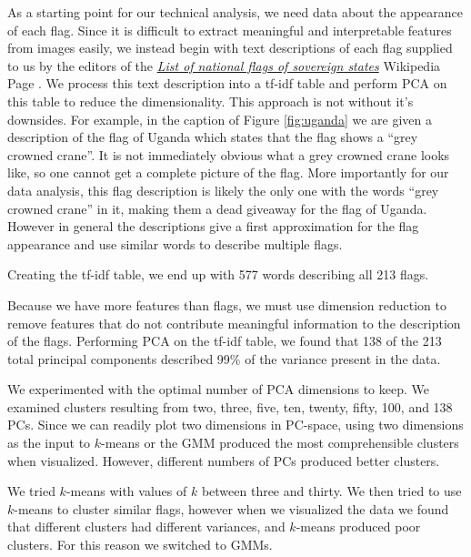 \documentclass[11pt]{amsart}
\newcommand{\todo}[1]{\textcolor{red}{TODO: #1}}
\begin{document}

As a starting point for our technical analysis, we need data about the
appearance of each flag. Since it is difficult to extract meaningful and
interpretable features from images easily, we instead begin with text
descriptions of each flag supplied to us by the editors of the
\href{https://en.wikipedia.org/wiki/List_of_national_flags_of_sovereign_states}{\emph{List
of national flags of sovereign states}} Wikipedia Page \cite{list-of-flags}. We
process this text description into a tf-idf table and perform PCA on this table
to reduce the dimensionality. This approach is not without it's downsides. For
example, in the caption of Figure \ref{fig:uganda} we are given a description of
the flag of Uganda which states that the flag shows a ``grey crowned crane''. It
is not immediately obvious what a grey crowned crane looks like, so one cannot
get a complete picture of the flag. More importantly for our data analysis, this
flag description is likely the only one with the words ``grey crowned crane'' in
it, making them a dead giveaway for the flag of Uganda. However in general the
descriptions give a first approximation for the flag appearance and use similar
words to describe multiple flags.

Creating the tf-idf table, we end up with 577 words describing all 213 flags.


Because we have more features than flags, we must use dimension reduction to
remove features that do not contribute meaningful information to the description
of the flags. Performing PCA on the tf-idf table, we found that 138 of the 213
total principal components described 99\% of the variance present in the data. 

We experimented with the optimal number of PCA dimensions to keep. We examined
clusters resulting from two, three, five, ten, twenty, fifty, 100, and 138 PCs.
Since we can readily plot two dimensions in PC-space, using two dimensions as
the input to \(k\)-means or the GMM produced the most comprehensible clusters
when visualized. However, different numbers of PCs produced better clusters.

We tried \(k\)-means with values of \(k\) between three and thirty.
We then tried to use \(k\)-means to cluster similar flags, however when we
visualized the data we found that different clusters had different variances,
and \(k\)-means produced poor clusters. For this reason we switched to GMMs.
\end{document}
